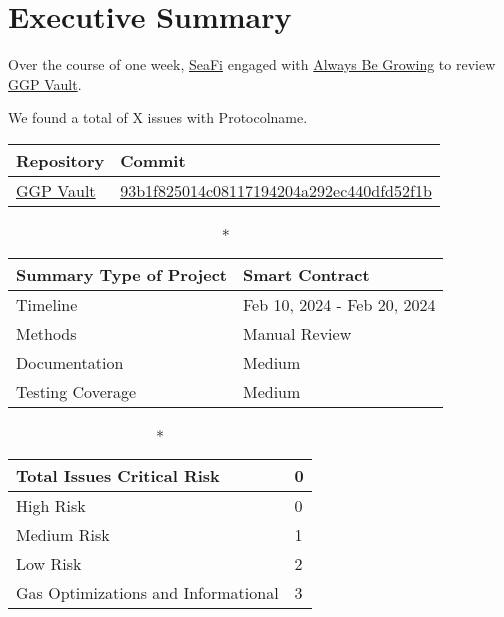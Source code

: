 \hypertarget{executive-summary}{%
\section{Executive Summary}\label{executive-summary}}

Over the course of one week, \href{https://seafi.app}{SeaFi} engaged with
\href{http://abg.garden}{Always Be Growing} to review
\href{https://github.com/SeaFi-Labs/GGP-Vault}{GGP Vault}. 

We found a total of X issues with Protocolname. 

\begin{longtable}[c]{|l|l|}
\hline \textbf{Repository} & \textbf{Commit} \\

\hline
\href{https://github.com/SeaFi-Labs/GGP-Vault}{GGP Vault} &
\href{https://github.com/SeaFi-Labs/GGP-Vault/commit/93b1f825014c08117194204a292ec440dfd52f1b}{93b1f825014c08117194204a292ec440dfd52f1b} \\
\hline
\end{longtable}

\begin{longtable}[]{|l|l|}

\caption*{\textbf{Summary}}
\hline Type of Project & Smart Contract \\   
\hline Timeline & Feb 10, 2024 - Feb 20, 2024   \\
\hline Methods & Manual Review \\
\hline Documentation & Medium \\
\hline Testing Coverage & Medium  \\
\hline
\end{longtable}


\begin{longtable}[]{|l|l|}
\caption*{\textbf{Total Issues}}
\hline Critical Risk & 0 \\
\hline High Risk & 0 \\
\hline Medium Risk & 1 \\ 
\hline Low Risk & 2 \\
\hline Gas Optimizations and Informational & 3 \\
\hline
\end{longtable}

